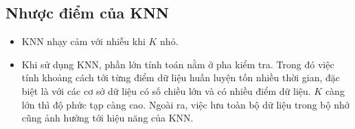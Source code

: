 \subsection{Nhược điểm của KNN}
\begin{itemize}
\item KNN nhạy cảm với nhiễu khi $K$ nhỏ.

\item Khi sử dụng KNN, phần lớn tính toán nằm ở pha
kiểm tra. Trong đó việc tính khoảng cách tới {từng} điểm dữ liệu
huấn luyện tốn nhiều thời gian, đặc biệt là với các cơ sở dữ
liệu có số chiều lớn và có nhiều điểm dữ liệu. $K$ càng lớn thì độ phức
tạp càng cao. Ngoài ra, việc lưu toàn bộ dữ liệu trong bộ nhớ cũng
ảnh hưởng tới hiệu năng của KNN.

\end{itemize}









